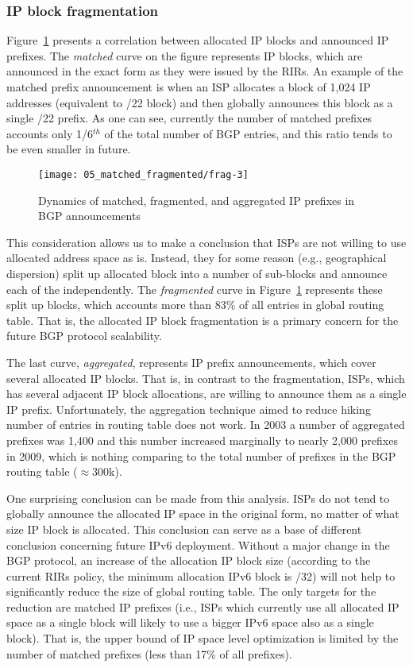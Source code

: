 \subsubsection{IP block fragmentation}

Figure~\ref{fig:fragmentation} presents a correlation between allocated IP
blocks and announced IP prefixes. The \emph{matched} curve on the figure
represents IP blocks, which are announced in the exact form as they were
issued by the RIRs. An example of the matched prefix announcement is when an
ISP allocates a block of 1,024 IP addresses (equivalent to /22 block) and then
globally announces this block as a single /22 prefix. As one can see,
currently the number of matched prefixes accounts only 1/6$^{th}$ of the total
number of BGP entries, and this ratio tends to be even smaller in future.

\begin{figure}[htbp]
	\centering
		\texttt{[image: 05\_matched\_fragmented/frag-3]}
	\caption{Dynamics of matched, fragmented, and aggregated IP prefixes in BGP announcements}
	\label{fig:fragmentation}
\end{figure}

This consideration allows us to make a conclusion that ISPs are not willing to
use allocated address space as is. Instead, they for some reason (e.g.,
geographical dispersion) split up allocated block into a number of sub-blocks
and announce each of the independently. The \emph{fragmented} curve in
Figure~\ref{fig:fragmentation} represents these split up blocks, which
accounts more than 83\% of all entries in global routing table. That is, the
allocated IP block fragmentation is a primary concern for the future BGP
protocol scalability.

The last curve, \emph{aggregated}, represents IP prefix announcements, which
cover several allocated IP blocks. That is, in contrast to the fragmentation,
ISPs, which has several adjacent IP block allocations, are willing to announce
them as a single IP prefix. Unfortunately, the aggregation technique aimed to
reduce hiking number of entries in routing table does not work. In 2003 a
number of aggregated prefixes was 1,400 and this number increased marginally
to nearly 2,000 prefixes in 2009, which is nothing comparing to the total
number of prefixes in the BGP routing table ($\approx$300k).

One surprising conclusion can be made from this analysis. ISPs do not tend to
globally announce the allocated IP space in the original form, no matter of
what size IP block is allocated. This conclusion can serve as a base of
different conclusion concerning future IPv6 deployment. Without a major change
in the BGP protocol, an increase of the allocation IP block size (according to
the current RIRs policy, the minimum allocation IPv6 block is
/32\cite{APNIC:2009:IPv6-Address}) will not help to significantly
reduce the size of global routing table. The only targets for the reduction
are matched IP prefixes (i.e., ISPs which currently use all allocated IP space
as a single block will likely to use a bigger IPv6 space also as a single
block). That is, the upper bound of IP space level optimization is limited by
the number of matched prefixes (less than 17\% of all prefixes).

